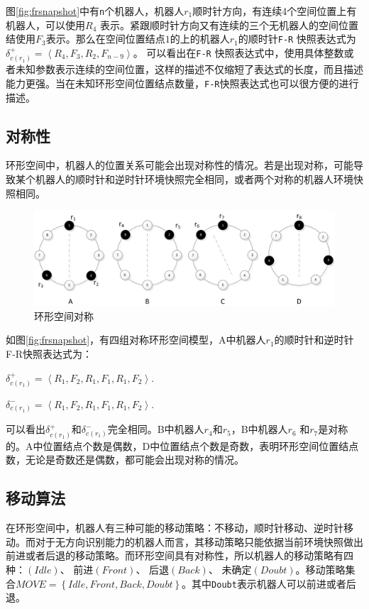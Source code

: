 图\ref{fig:frsnapshot}中有\verb|n|个机器人，机器人$r_1$顺时针方向，有连续4个空间位置上有机器人，可以使用$R_4$ 表示。紧跟顺时针方向又有连续的三个无机器人的空间位置结使用$F_3$表示。那么在空间位置结点$1$的上的机器人$r_1$的顺时针\verb|F-R| 快照表达式为$\delta_{c\left(r_1\right)}^+ = \left\langle R_4,F_3,R_2,F_{n-9}\right\rangle$。 可以看出在\verb|F-R| 快照表达式中，使用具体整数或者未知参数表示连续的空间位置，这样的描述不仅缩短了表达式的长度，而且描述能力更强。当在未知环形空间位置结点数量，\verb|F-R|快照表达式也可以很方便的进行描述。

\subsection{对称性}
环形空间中，机器人的位置关系可能会出现对称性的情况。若是出现对称，可能导致某个机器人的顺时针和逆时针环境快照完全相同，或者两个对称的机器人环境快照相同。

\begin{figure}[!hbt]
	\centering
	\includegraphics[width=3.5 in]{fig/symmetric.png}
	\caption{环形空间对称}
	\label{fig:symmetric}
\end{figure}

如图\ref{fig:frsnapshot}，有四组对称环形空间模型，A中机器人$r_1$的顺时针和逆时针F-R快照表达式为：

 $\delta_{c\left(r_1\right)}^+ = \left\langle R_1,F_2,R_1,F_1,R_1,F_2 \right\rangle.$

 $\delta_{c\left(r_1\right)}^- = \left\langle R_1,F_2,R_1,F_1,R_1,F_2 \right\rangle.$

 可以看出$\delta_{c\left(r_1\right)}^+$和$\delta_{c\left(r_1\right)}^-$完全相同。B中机器人$r_4$和$r_5$，B中机器人$r_6$ 和$r_7$是对称的。A中位置结点个数是偶数，D中位置结点个数是奇数，表明环形空间位置结点数，无论是奇数还是偶数，都可能会出现对称的情况。

\subsection{移动算法}
在环形空间中，机器人有三种可能的移动策略：不移动，顺时针移动、逆时针移动。而对于无方向识别能力的机器人而言，其移动策略只能依据当前环境快照做出前进或者后退的移动策略。而环形空间具有对称性，所以机器人的移动策略有四种：$\left(Idle\right)$、 前进$\left(Front\right)$、 后退$\left(Back\right)$、 未确定$\left(Doubt\right)$。移动策略集合$MOVE = \left\{Idle,Front,Back,Doubt\right\}$。其中\verb|Doubt|表示机器人可以前进或者后退。

